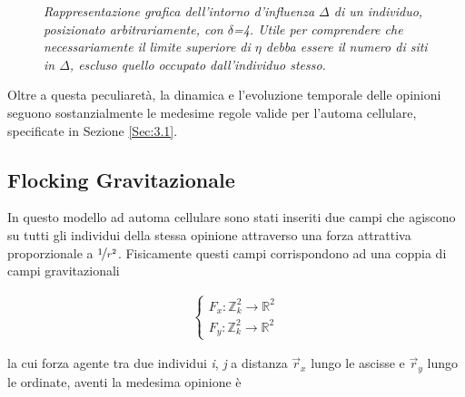 \documentclass{article}
\begin{document}
\begin{figure}[h]
\centering
{}
\caption{\textit{Rappresentazione grafica dell'intorno d'influenza $\Delta$ di un individuo, posizionato arbitrariamente, con $\delta$=4. Utile per comprendere che necessariamente il limite superiore di $\eta$ debba essere il numero di siti in $\Delta$, escluso quello occupato dall'individuo stesso.}}
\label{fig:6}
\end{figure}

Oltre a questa peculiaretà, la dinamica e l'evoluzione temporale delle opinioni seguono sostanzialmente le medesime regole valide per l'automa cellulare, specificate in Sezione \ref{Sec:3.1}.


\subsection{Flocking Gravitazionale}
\label{Sec:3.3}

In questo modello ad automa cellulare sono stati inseriti due campi che agiscono su tutti gli individui della stessa opinione attraverso una forza attrattiva proporzionale a $\nicefrac{1}{r^2}$. Fisicamente questi campi corrispondono ad una coppia di campi gravitazionali

\begin{equation}
\begin{aligned}
\begin{cases}
F_x:  \mathbb{Z}^2_k \rightarrow \mathbb{R}^2 \\
F_y:  \mathbb{Z}^2_k \rightarrow \mathbb{R}^2 
\end{cases}
\end{aligned}
\end{equation}

la cui forza agente tra due individui \textit{i}, \textit{j} a distanza $\vec{r}_{x}$ lungo le ascisse e $\vec{r}_{y}$ lungo le ordinate, aventi la medesima opinione è
\end{document}
